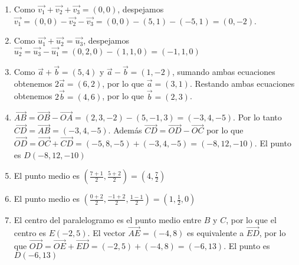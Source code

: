\documentclass[a4paper]{article}
\newcommand{\df}[2]{\displaystyle\frac{#1}{#2}}
\newcommand{\vect}[1]{\overrightarrow{#1}}
\begin{document}
\begin{enumerate}
\begin{enumerate} [label=(\alph*)]
		\item Como $\vect{v_1}+\vect{v_2}+\vect{v_3}=(0,0)$, despejamos $\vect{v_1} = (0,0) -\vect{v_2} - \vect{v_3} = (0,0) - (5,1) - (-5,1) = (0,-2)$.
		\item Como $\vect{u_1} + \vect{u_2} = \vect{u_3}$, despejamos $\vect{u_2} = \vect{u_3} - \vect{u_1} = (0,2,0) - (1,1,0) = (-1,1,0)$
		\item Como $\vec{a}+\vec{b}=(5,4)$ y $\vec{a}-\vec{b}=(1,-2)$, sumando ambas ecuaciones obtenemos $2\vec{a}=(6,2)$, por lo que $\vec{a}=(3,1)$. Restando ambas ecuaciones obtenemos $2\vec{b}=(4,6)$, por lo que $\vec{b}=(2,3)$.
		\item $\vect{AB} = \vect{OB} - \vect{OA} = (2,3,-2) - (5,-1,3) = (-3,4,-5)$. Por lo tanto $\vect{CD} = \vect{AB} = (-3,4,-5)$. Además $ \vect{CD}= \vect{OD} - \vect{OC}$ por lo que $\vect{OD} = \vect{OC} + \vect{CD} = (-5,8,-5) + (-3,4,-5) = (-8,12,-10)$. El punto es $D(-8,12,-10)$
		\item El punto medio es $\left(\df{7+1}{2}, \df{5+2}{2}\right) = \left(4,\df{7}{2}\right)$
		\item El punto medio es $\left(\df{0+2}{2}, \df{-1+2}{2}, \df{1-1}{2}\right) = \left(1,\df{1}{2},0\right)$
		\item El centro del paralelogramo es el punto medio entre $B$ y $C$, por lo que el centro es $E(-2,5)$. El vector $\vect{AE}=(-4,8)$ es equivalente a $\vect{ED}$, por lo que $\vect{OD} = \vect{OE} + \vect{ED} = (-2,5) + (-4,8) = (-6,13)$. El punto es $D(-6,13)$
\end{enumerate}\end{enumerate}
\end{document}
